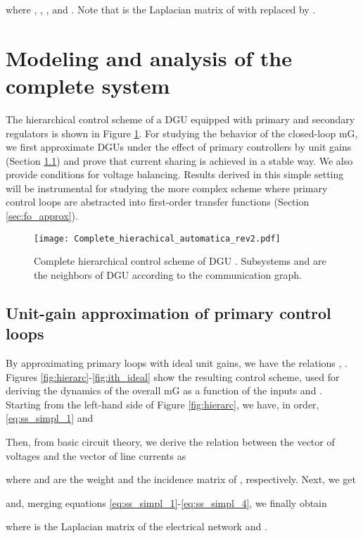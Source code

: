 \documentclass[a4paper]{article}
\theoremstyle{plain}
\begin{document}
where , , ,  and . Note that  is the Laplacian matrix of  with  replaced by .

\section{Modeling and analysis of the complete system}
\label{sec:modeling_and_analysis}
The hierarchical control scheme of a DGU equipped with primary and
secondary regulators is shown in Figure \ref{fig:ctrl_complete}. For
studying the behavior of the closed-loop mG, we first approximate DGUs under the effect of primary controllers by unit
gains (Section \ref{sec:simpl_model}) and prove that current sharing is achieved in a stable way. We also provide conditions for voltage balancing. Results derived in this simple setting will be 
instrumental for studying the more complex scheme where primary
control loops are abstracted into first-order transfer functions
(Section \ref{sec:fo_approx}).  

\begin{figure}
	\centering
	\texttt{[image: Complete\_hierachical\_automatica\_rev2.pdf]}
	\caption{Complete hierarchical control scheme of DGU . Subsystems  and  are the neighbors of DGU  according to the communication graph.}
	\label{fig:ctrl_complete}
\end{figure}
\subsection{Unit-gain approximation of primary control loops}
\label{sec:simpl_model}
By approximating primary
loops with ideal unit gains, we have the relations ,
. \\
Figures \ref{fig:hierarc}-\ref{fig:ith_ideal} show the resulting control scheme, used for deriving the dynamics of the overall mG as a function of the inputs  and
. Starting from
the left-hand side of Figure \ref{fig:hierarc}, we have, in order, \eqref{eq:ss_simpl_1} and 

Then, from basic circuit theory, we derive the relation between the vector of voltages  and the vector of line currents  as
  
where  and  are the weight and the incidence matrix of , respectively. Next, we get
 
and, merging equations \eqref{eq:ss_simpl_1}-\eqref{eq:ss_simpl_4}, we finally obtain
 
where  is the
Laplacian matrix of the electrical network and . 
\end{document}
